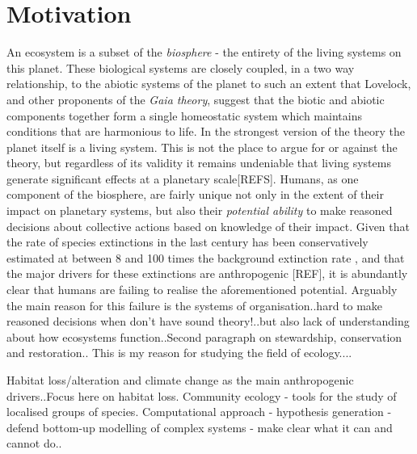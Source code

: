 


\section{Motivation}
\label{sec:intro_motivation}

An ecosystem is a subset of the \emph{biosphere} - the entirety of the living systems on this planet. These biological systems are closely coupled, in a two way relationship, to the abiotic systems of the planet to such an extent that Lovelock, and other proponents of the \emph{Gaia theory}, suggest that the biotic and abiotic components together form a single homeostatic system which maintains conditions that are harmonious to life. In the strongest version of the theory the planet itself is a living system. This is not the place to argue for or against the theory, but regardless of its validity it remains undeniable that living systems generate significant effects at a planetary scale[REFS]. Humans, as one component of the biosphere, are fairly unique not only in the extent of their impact on planetary systems, but also their \emph{potential ability} to make reasoned decisions about collective actions based on knowledge of their impact. Given that the rate of species extinctions in the last century has been conservatively estimated at between 8 and 100 times the background extinction rate  \cite{ceballos2015accelerated}, and that the major drivers for these extinctions are anthropogenic [REF], it is abundantly clear that humans are failing to realise the aforementioned potential. Arguably the main reason for this failure is the systems of organisation..hard to make reasoned decisions when don't have sound theory!..but also lack of understanding about how ecosystems function..Second paragraph on stewardship, conservation and restoration..  This is my reason for studying the field of ecology....

Habitat loss/alteration and climate change as the main anthropogenic drivers..Focus here on habitat loss. Community ecology - tools for the study of localised groups of species. Computational approach - hypothesis generation - defend bottom-up modelling of complex systems - make clear what it can and cannot do..

